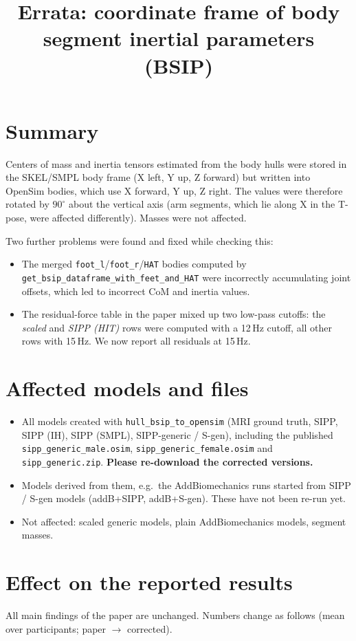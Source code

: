 \documentclass[10pt,a4paper]{article}
\title{Errata: coordinate frame of body segment inertial parameters (BSIP)}
\author{}
\date{}\vspace{-2em}
\begin{document}
\maketitle

\section*{Summary}
Centers of mass and inertia tensors estimated from the body hulls were stored in the SKEL/SMPL body frame (X left, Y up, Z forward) but written into OpenSim bodies, which use X forward, Y up, Z right. The values were therefore rotated by $90^\circ$ about the vertical axis (arm segments, which lie along X in the T-pose, were affected differently). Masses were not affected.

Two further problems were found and fixed while checking this:
\begin{itemize}
  \item The merged \texttt{foot\_l}/\texttt{foot\_r}/\texttt{HAT} bodies computed by \texttt{get\_bsip\_dataframe\_with\_feet\_and\_HAT} were incorrectly accumulating joint offsets, which led to incorrect CoM and inertia values.
  \item The residual-force table in the paper mixed up two low-pass cutoffs: the \emph{scaled} and \emph{SIPP (HIT)} rows were computed with a 12\,Hz cutoff, all other rows with 15\,Hz. We now report all residuals at 15\,Hz.
\end{itemize}

\section*{Affected models and files}
\begin{itemize}
  \item All models created with \texttt{hull\_bsip\_to\_opensim} (MRI ground truth, SIPP, SIPP (IH), SIPP (SMPL), SIPP-generic / S-gen), including the published \texttt{sipp\_generic\_male.osim}, \texttt{sipp\_generic\_female.osim} and \texttt{sipp\_generic.zip}. \textbf{Please re-download the corrected versions.}
  \item Models derived from them, e.g.\ the AddBiomechanics runs started from SIPP / S-gen models (addB+SIPP, addB+S-gen). These have not been re-run yet.
  \item Not affected: scaled generic models, plain AddBiomechanics models, segment masses.
\end{itemize}

\section*{Effect on the reported results}
All main findings of the paper are unchanged. Numbers change as follows (mean over participants; paper $\rightarrow$ corrected).
\end{document}
